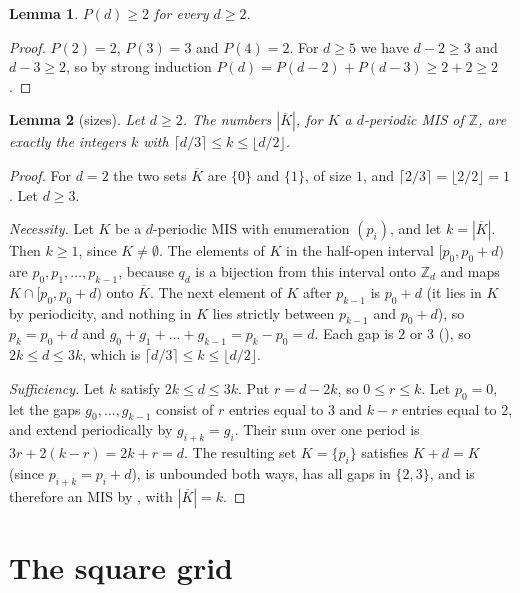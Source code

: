\documentclass[11pt]{article}
\theoremstyle{plain}
\newtheorem{lemma}[lemma]{Lemma}
\theoremstyle{definition}
\theoremstyle{remark}
\newcommand{\Z}{\mathbb{Z}}
\newcommand{\Per}{P}
\begin{document}
\begin{lemma}\label{lem:perrin-positive}
$\Per(d) \ge 2$ for every $d \ge 2$.
\end{lemma}

\begin{proof}
$\Per(2) = 2$, $\Per(3) = 3$ and $\Per(4) = 2$. For $d \ge 5$ we have $d - 2 \ge 3$ and
$d - 3 \ge 2$, so by strong induction $\Per(d) = \Per(d-2) + \Per(d-3) \ge 2 + 2 \ge 2$.
\end{proof}

\begin{lemma}[sizes]\label{lem:sizes}
Let $d \ge 2$. The numbers $|\overline{K}|$, for $K$ a $d$-periodic MIS of $\Z$, are exactly
the integers $k$ with $\lceil d/3 \rceil \le k \le \lfloor d/2 \rfloor$.
\end{lemma}

\begin{proof}
For $d = 2$ the two sets $\overline{K}$ are $\{0\}$ and $\{1\}$, of size $1$, and
$\lceil 2/3 \rceil = \lfloor 2/2 \rfloor = 1$. Let $d \ge 3$.

\emph{Necessity.} Let $K$ be a $d$-periodic MIS with enumeration $(p_i)$, and let
$k = |\overline{K}|$. Then $k \ge 1$, since $K \ne \emptyset$. The elements of $K$ in the
half-open interval $[p_0, p_0 + d)$ are $p_0, p_1, \dots, p_{k-1}$, because $q_d$ is a
bijection from this interval onto $\Z_d$ and maps $K \cap [p_0, p_0 + d)$ onto
$\overline{K}$. The next element of $K$ after $p_{k-1}$ is $p_0 + d$ (it lies in $K$ by
periodicity, and nothing in $K$ lies strictly between $p_{k-1}$ and $p_0 + d$), so
$p_k = p_0 + d$ and $g_0 + g_1 + \dots + g_{k-1} = p_k - p_0 = d$. Each gap is $2$ or $3$
(), so $2k \le d \le 3k$, which is $\lceil d/3 \rceil \le k \le \lfloor d/2
\rfloor$.

\emph{Sufficiency.} Let $k$ satisfy $2k \le d \le 3k$. Put $r = d - 2k$, so $0 \le r \le k$.
Let $p_0 = 0$, let the gaps $g_0, \dots, g_{k-1}$ consist of $r$ entries equal to $3$ and
$k - r$ entries equal to $2$, and extend periodically by $g_{i+k} = g_i$. Their sum over one
period is $3r + 2(k - r) = 2k + r = d$. The resulting set $K = \{p_i\}$ satisfies
$K + d = K$ (since $p_{i+k} = p_i + d$), is unbounded both ways, has all gaps in $\{2,3\}$,
and is therefore an MIS by , with $|\overline{K}| = k$.
\end{proof}

\section{The square grid}\label{sec:grid}
\end{document}
